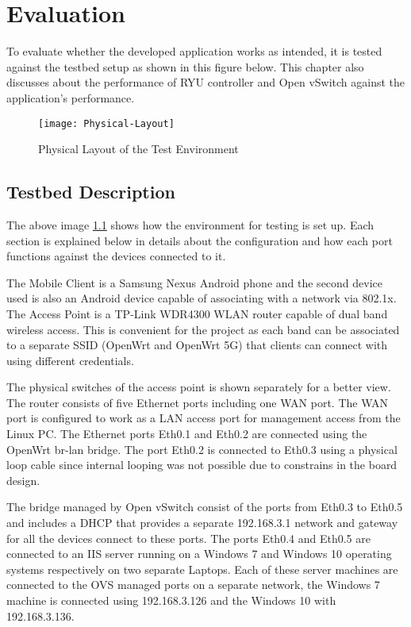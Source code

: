 \chapter{Evaluation}\label{ch:Evaluation}
To evaluate whether the developed application works as intended, it is tested against the testbed setup as shown in this figure below. This chapter also discusses about the performance of RYU controller and Open vSwitch against the application’s performance.

  \begin{figure}[H]
	\centering
	\texttt{[image: Physical-Layout]}
	\caption {Physical Layout of the Test Environment}
	\label{fig:test-layout}
	\vspace{-10pt}
  \end{figure}

\section{Testbed Description}
The above image \ref{fig:test-layout} shows how the environment for testing is set up. Each section is explained below in details about the configuration and how each port functions against the devices connected to it.

The Mobile Client is a Samsung Nexus Android phone and the second device used is also an Android device capable of associating with a network via 802.1x. The Access Point is a TP-Link WDR4300 WLAN router capable of dual band wireless access. This is convenient for the project as each band can be associated to a separate SSID (OpenWrt and OpenWrt 5G) that clients can connect with using different credentials.

The physical switches of the access point is shown separately for a better view. The router consists of five Ethernet ports including one WAN port. The WAN port is configured to work as a LAN access port for management access from the Linux PC. The Ethernet ports Eth0.1 and Eth0.2 are connected using the OpenWrt br-lan bridge. The port Eth0.2 is connected to Eth0.3 using a physical loop cable since internal looping was not possible due to constrains in the board design.

The bridge managed by Open vSwitch consist of the ports from Eth0.3 to Eth0.5 and includes a DHCP that provides a separate 192.168.3.1 network and gateway for all the devices connect to these ports. The ports Eth0.4 and Eth0.5 are connected to an IIS server running on a Windows 7 and Windows 10 operating systems respectively on two separate Laptops. Each of these server machines are connected to the OVS managed ports on a separate network, the Windows 7 machine is connected using 192.168.3.126 and the Windows 10 with 192.168.3.136.

